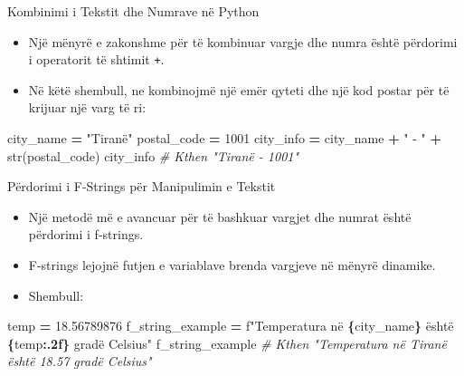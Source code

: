 \documentclass[
  ignorenonframetext,
]{beamer}
\newenvironment{Shaded}{\begin{snugshade}}{\end{snugshade}}
\newcommand{\BuiltInTok}[1]{#1}
\newcommand{\CommentTok}[1]{\textcolor[rgb]{0.56,0.35,0.01}{\textit{#1}}}
\newcommand{\DecValTok}[1]{\textcolor[rgb]{0.00,0.00,0.81}{#1}}
\newcommand{\FloatTok}[1]{\textcolor[rgb]{0.00,0.00,0.81}{#1}}
\newcommand{\NormalTok}[1]{#1}
\newcommand{\OperatorTok}[1]{\textcolor[rgb]{0.81,0.36,0.00}{\textbf{#1}}}
\newcommand{\SpecialCharTok}[1]{\textcolor[rgb]{0.81,0.36,0.00}{\textbf{#1}}}
\newcommand{\SpecialStringTok}[1]{\textcolor[rgb]{0.31,0.60,0.02}{#1}}
\newcommand{\StringTok}[1]{\textcolor[rgb]{0.31,0.60,0.02}{#1}}
\begin{document}
\begin{frame}[fragile]{Kombinimi i Tekstit dhe Numrave në Python}
\protect\hypertarget{kombinimi-i-tekstit-dhe-numrave-nuxeb-python}{}
\begin{itemize}
\item
  Një mënyrë e zakonshme për të kombinuar vargje dhe numra është
  përdorimi i operatorit të shtimit \texttt{+}.
\item
  Në këtë shembull, ne kombinojmë një emër qyteti dhe një kod postar për
  të krijuar një varg të ri:
\end{itemize}

\begin{Shaded}
\begin{Highlighting}[]
\NormalTok{  city\_name }\OperatorTok{=} \StringTok{"Tiranë"}
\NormalTok{  postal\_code }\OperatorTok{=} \DecValTok{1001}
\NormalTok{  city\_info }\OperatorTok{=}\NormalTok{ city\_name }\OperatorTok{+} \StringTok{" {-} "} \OperatorTok{+} \BuiltInTok{str}\NormalTok{(postal\_code)}
\NormalTok{  city\_info  }\CommentTok{\# Kthen "Tiranë {-} 1001"}
\end{Highlighting}
\end{Shaded}
\end{frame}

\begin{frame}[fragile]{Përdorimi i F-Strings për Manipulimin e Tekstit}
\protect\hypertarget{puxebrdorimi-i-f-strings-puxebr-manipulimin-e-tekstit}{}
\begin{itemize}
\item
  Një metodë më e avancuar për të bashkuar vargjet dhe numrat është
  përdorimi i f-strings.
\item
  F-strings lejojnë futjen e variablave brenda vargjeve në mënyrë
  dinamike.
\item
  Shembull:
\end{itemize}

\begin{Shaded}
\begin{Highlighting}[]
\NormalTok{temp }\OperatorTok{=} \FloatTok{18.56789876}
\NormalTok{f\_string\_example }\OperatorTok{=} \SpecialStringTok{f"Temperatura në }\SpecialCharTok{\{}\NormalTok{city\_name}\SpecialCharTok{\}}\SpecialStringTok{ është }\SpecialCharTok{\{}\NormalTok{temp}\SpecialCharTok{:.2f\}}\SpecialStringTok{ gradë Celsius"}
\NormalTok{f\_string\_example  }\CommentTok{\# Kthen "Temperatura në Tiranë është 18.57 gradë Celsius"}
\end{Highlighting}
\end{Shaded}
\end{frame}
\end{document}
